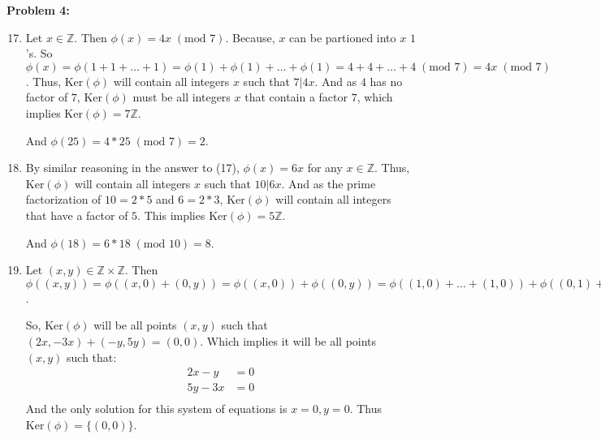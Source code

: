 \documentclass[12pt, letterpaper]{article}
\newenvironment{problem}
    [1]
    {\noindent \textbf{Problem #1:}}
    {\vspace{3mm}}
\begin{document}
\begin{problem}{4}
    \begin{enumerate}
        \setcounter{enumi}{16}

        \item Let $x \in \mathbb{Z}$. Then $\phi(x) = 4x \;(\text{mod } 7)$. Because, $x$ can be 
        partioned into $x$ $1$'s. So $\phi(x) = \phi(1 + 1 + \ldots + 1) = \phi(1) + \phi(1) + 
        \ldots + \phi(1) = 4 + 4 + \ldots + 4 \;(\text{mod } 7) = 4x \;(\text{mod } 7)$. Thus,
        $\text{Ker}(\phi)$ will contain all integers $x$ such that $7 | 4x$. And as $4$ has no 
        factor of $7$, $\text{Ker}(\phi)$ must be all integers $x$ that contain a factor $7$,
        which implies $\text{Ker}(\phi) = 7\mathbb{Z}$.

        \bigskip\noindent
        And $\phi(25) = 4*25 \; (\text{mod } 7) = 2$.

        \item By similar reasoning in the answer to (17), $\phi(x) = 6x$ for any $x \in \mathbb{Z}$.
        Thus, $\text{Ker}(\phi)$ will contain all integers $x$ such that $10 | 6x$. And as the prime
        factorization of $10 = 2 * 5$ and $6 = 2 * 3$, $\text{Ker}(\phi)$ will contain all integers 
        that have a factor of $5$. This implies $\text{Ker}(\phi) = 5\mathbb{Z}$.

        \bigskip\noindent
        And $\phi(18) = 6*18 \; (\text{mod } 10) = 8$.

        \setcounter{enumi}{22}

        \item Let $(x, y) \in \mathbb{Z} \times \mathbb{Z}$. Then $\phi((x, y)) = \phi((x, 0) + (0, y)) =
        \phi((x, 0)) + \phi((0, y)) = \phi((1, 0) + \ldots + (1, 0)) + \phi((0, 1) + \ldots + (0, 1)) = 
        \phi((1, 0)) + \ldots + \phi((1, 0)) + \phi((0, 1)) + \ldots + \phi((0, 1)) = (2, -3) + \ldots 
        (2, -3) + (-1, 5) + \ldots + (-1, 5) = (2x, -3x) + (-y, 5y)$.

        \bigskip\noindent
        So, $\text{Ker}(\phi)$ will be all points $(x, y)$ such that $(2x, -3x) + (-y, 5y) = (0, 0)$.
        Which implies it will be all points $(x, y)$ such that:
            \begin{align*}
                2x - y &= 0\\
                5y - 3x &= 0\\
            \end{align*}
        And the only solution for this system of equations is $x = 0, y = 0$. Thus $\text{Ker}(\phi) = 
        \{(0, 0)\}$.


\end{enumerate}
\end{problem}
\end{document}
